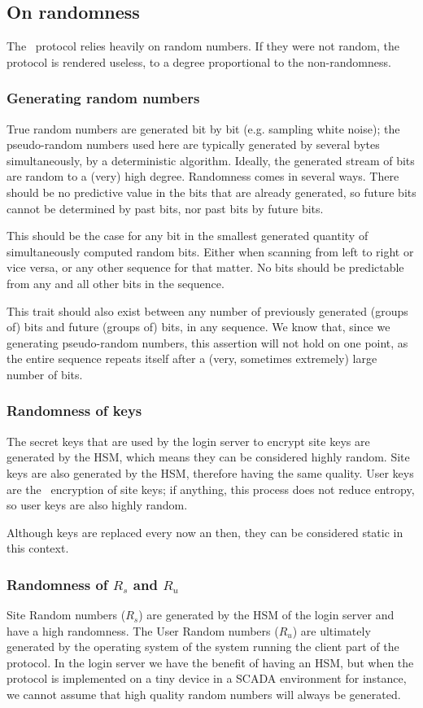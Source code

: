 \subsection{On randomness}
The \TIMO\ protocol relies heavily on random numbers.
If they were not random, the protocol is rendered useless, to a degree proportional to the non-randomness.
\subsubsection{Generating random numbers}
True random numbers are generated bit by bit
(e.g. sampling white noise);
the pseudo-random numbers used here are typically generated by several bytes simultaneously,
by a deterministic algorithm.
Ideally,
the generated stream of bits are random to a
(very)
high degree.
Randomness comes in several ways.
There should be no predictive value in the bits that are already generated,
so future bits cannot be determined by past bits,
nor past bits by future bits.
\par
This should be the case for any bit in the smallest generated quantity of simultaneously computed random bits.
Either when scanning from left to right or vice versa, or any other sequence for that matter.
No bits should be predictable from any and all other bits in the sequence.
\par
This trait should also exist between any number of previously generated
(groups of)
bits and future
(groups of)
bits,
in any sequence.
We know that,
since we generating pseudo-random numbers,
this assertion will not hold on one point,
as the entire sequence repeats itself after a
(very,
sometimes extremely)
large number of bits.
\subsubsection{Randomness of keys}
The secret keys that are used by the login server to encrypt site keys are generated by the HSM,
which means they can be considered highly random.
Site keys are also generated by the HSM,
therefore having the same quality.
User keys are the \AES\ encryption of site keys;
if anything,
this process does not reduce entropy,
so user keys are also highly random.
\par
Although keys are replaced every now an then,
they can be considered static in this context.
\subsubsection{Randomness of $R_s$ and $R_u$}
Site Random numbers
($R_s$)
are generated by the HSM of the login server and have a high randomness.
The User Random numbers
($R_u$)
are ultimately generated by the operating system of the system running the client part of the protocol.
In the login server we have the benefit of having an HSM,
but when the protocol is implemented on a tiny device in a SCADA environment for instance,
we cannot assume that high quality random numbers will always be generated.
